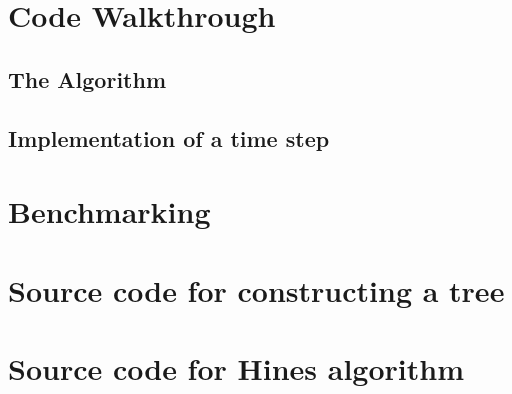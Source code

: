 \documentclass[11pt,a4paper]{article}
\begin{document}
\section{Code Walkthrough}


\subsection{The Algorithm}


\subsection{Implementation of a time step}


\section{Benchmarking}

\newpage
\appendix
\newpage
\section{Source code for constructing a tree}

\newpage
\section{Source code for Hines algorithm}
\label{appendix:hinessource}

\end{document}
